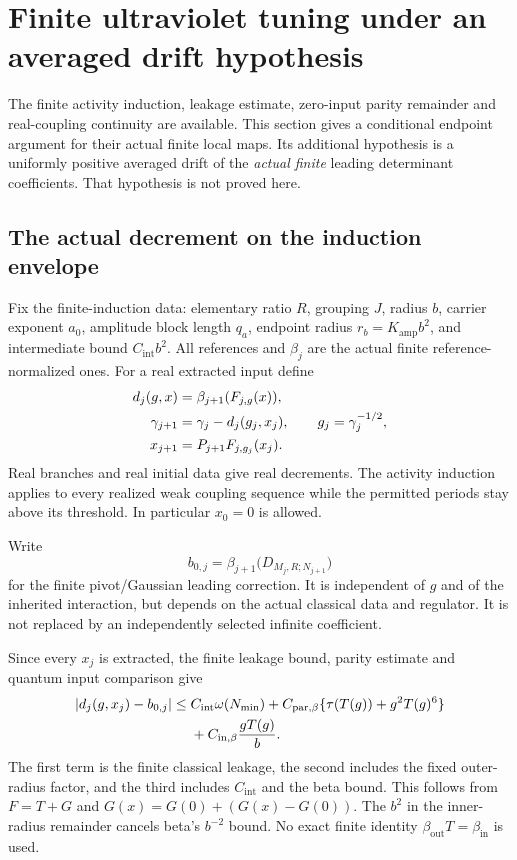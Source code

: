 \documentclass[11pt]{article}
\theoremstyle{remark}
\begin{document}
\section{Finite ultraviolet tuning under an averaged drift hypothesis}
\label{fts-section}

The finite activity induction, leakage estimate, zero-input
parity remainder and real-coupling continuity are available.
This section gives a conditional endpoint argument for their
actual finite local maps. Its additional hypothesis is a
uniformly positive averaged drift of the \emph{actual finite}
leading determinant coefficients. That hypothesis is not
proved here.

\subsection{The actual decrement on the induction envelope}
\label{fts-decrement-section}

Fix the finite-induction data: elementary ratio $R$, grouping
$J$, radius $b$, carrier exponent $a_0$, amplitude block length
$q_a$, endpoint radius $r_b=K_{\mathrm{amp}}b^2$, and intermediate
bound $C_{\mathrm{int}}b^2$. All references and $\beta_j$ are the
actual finite reference-normalized ones. For a real extracted
input define
\begin{align}
 d_j(g,x)&=\beta_{j+1}(F_{j,g}(x)),\notag\\
 \gamma_{j+1}&=\gamma_j-d_j(g_j,x_j),\qquad
 g_j=\gamma_j^{-1/2},\notag\\
 x_{j+1}&=P_{j+1}F_{j,g_j}(x_j).
 \label{fts-actual-update}
\end{align}
Real branches and real initial data give real decrements.
The activity induction applies to every realized weak
coupling sequence while the permitted periods stay above
its threshold. In particular $x_0=0$ is allowed.

Write
\begin{equation}
 b_{0,j}=\beta_{j+1}
       \bigl(D_{M_j,R;N_{j+1}}\bigr)
 \label{fts-leading-coefficient}
\end{equation}
for the finite pivot/Gaussian leading correction. It is
independent of $g$ and of the inherited interaction, but
depends on the actual classical data and regulator. It is
not replaced by an independently selected infinite coefficient.

Since every $x_j$ is extracted, the finite leakage bound,
parity estimate and quantum input comparison give
\begin{align}
 |d_j(g,x_j)-b_{0,j}|
 \leq{}& C_{\mathrm{int}}\omega(N_{\min})
   +C_{\mathrm{par},\beta}
       \{\tau(T(g))+g^2T(g)^6\}\notag\\
 &+C_{\mathrm{in},\beta}\frac{gT(g)}b .
 \label{fts-decrement-error}
\end{align}
The first term is the finite classical leakage, the second
includes the fixed outer-radius factor, and the third includes
$C_{\mathrm{int}}$ and the beta bound. This follows from
$F=T+G$ and $G(x)=G(0)+(G(x)-G(0))$. The $b^2$ in the
inner-radius remainder cancels beta's $b^{-2}$ bound.
No exact finite identity $\beta_{\mathrm{out}}T
=\beta_{\mathrm{in}}$ is used.
\end{document}
